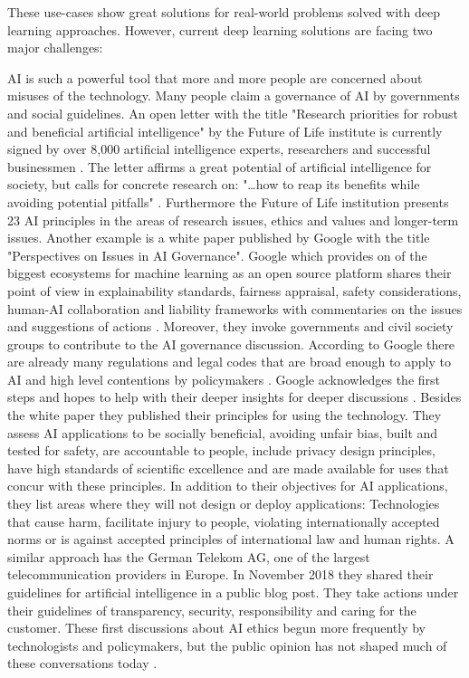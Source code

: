 These use-cases show great solutions for real-world problems solved with deep learning approaches.
However, current deep learning solutions are facing two major challenges:

AI is such a powerful tool that more and more people are concerned about misuses of the technology.
Many people claim a governance of AI by governments and social guidelines.
An open letter with the title "Research priorities for robust and beneficial artificial intelligence" by the Future of Life institute is currently signed by over 8,000 artificial intelligence experts, researchers and successful businessmen \cite{futureoflife-ai-open-letter, futureoflife-research-priorities}.
The letter affirms a great potential of artificial intelligence for society, but calls for concrete research on: "…how to reap its benefits while avoiding potential pitfalls" \cite{futureoflife-ai-open-letter}.
Furthermore the Future of Life institution presents 23 AI principles in the areas of research issues, ethics and values and longer-term issues. \cite{futureoflife-ai-principles}
\hfill \break
Another example is a white paper published by Google with the title "Perspectives on Issues in AI Governance".
Google which provides on of the biggest ecosystems for machine learning as an open source platform shares their point of view in explainability standards, fairness appraisal, safety considerations, human-AI collaboration and liability frameworks with commentaries on the issues and suggestions of actions \cite{google-ai-governance}.
Moreover, they invoke governments and civil society groups to contribute to the AI governance discussion.
According to Google there are already many regulations and legal codes that are broad enough to apply to AI and high level contentions by policymakers \cite[page 3]{google-ai-governance}.
Google acknowledges the first steps and hopes to help with their deeper insights for deeper discussions \cite[page 4]{google-ai-governance}.
\hfill \break
Besides the white paper they published their principles for using the technology.
They assess AI applications to be socially beneficial, avoiding unfair bias, built and tested for safety, are accountable to people, include privacy design principles, have high standards of scientific excellence and are made available for uses that concur with these principles.
In addition to their objectives for AI applications, they list areas where they will not design or deploy applications:
Technologies that cause harm, facilitate injury to people, violating internationally accepted norms or is against accepted principles of international law and human rights.
\cite{google-ai-principles}
\hfill \break
A similar approach has the German Telekom AG, one of the largest telecommunication providers in Europe.
In November 2018 they shared their guidelines for artificial intelligence in a public blog post.
They take actions under their guidelines of transparency, security, responsibility and caring for the customer.
\cite{telekom-ai-guidelines}
\hfill \break
These first discussions about AI ethics begun more frequently by technologists and policymakers, but the public opinion has not shaped much of these conversations today \cite{governanceai_public_report}.

